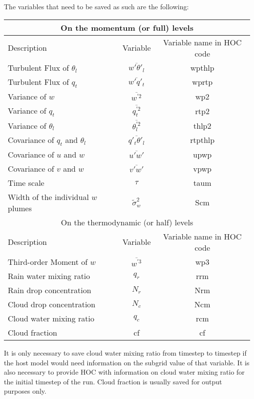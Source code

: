 \documentclass[11pt,fleqn]{article}
\begin{document}
The variables that need to be saved as such are the following:
\begin{center}
\begin{tabular} {|l|c|c|}
\hline
\multicolumn{3}{|c|}{On the momentum (or full) levels}\\\hline
Description&Variable&Variable name in HOC code\\\hline
Turbulent Flux of $\theta_l$&$\overline{w'\theta'_l}$&wpthlp\\\hline
Turbulent Flux of $q_t$&$\overline{w'q'_t}$&wprtp\\\hline
Variance of $w$&$\overline{w^{'2}}$&wp2\\\hline
Variance of $q_t$&$\overline{q^{'2}_t}$&rtp2\\\hline
Variance of $\theta_l$&$\overline{\theta^{'2}_l}$&thlp2\\\hline
Covariance of $q_t$ and $\theta_l$&$\overline{q'_t\theta'_l}$&rtpthlp\\\hline
Covariance of $u$ and $w$&$\overline{u'w'}$&upwp\\\hline
Covariance of $v$ and $w$&$\overline{v'w'}$&vpwp\\\hline
Time scale&$\tau$&taum\\\hline
Width of the individual $w$ plumes&$\tilde{\sigma}^2_w$&Scm\\\hline
\multicolumn{3}{|c|}{On the thermodynamic (or half) levels}\\\hline
Description&Variable&Variable name in HOC code\\\hline
Third-order Moment of $w$&$\overline{w^{'3}}$&wp3\\\hline
Rain water mixing ratio&$q_r$&rrm\\\hline
Rain drop concentration&$N_r$&Nrm\\\hline
Cloud drop concentration&$N_c$&Ncm\\\hline
Cloud water mixing ratio&$q_c$&rcm\\\hline
Cloud fraction&cf&cf\\\hline
\end{tabular}
\end{center}
It is only necessary to save cloud water mixing ratio from timestep to timestep
if the host model would need information on the subgrid value of that variable.
It is also necessary to provide HOC with information on cloud water mixing
ratio for the initial timestep of the run.  Cloud fraction is usually saved for
output purposes only.

%

\clearpage

\end{document}
